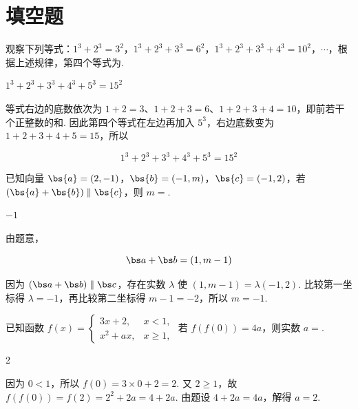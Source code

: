 \section{填空题}

\begin{problem}
观察下列等式：\(1^{3} + 2^{3} = 3^{2}\)，\(1^{3} + 2^{3} + 3^{3} = 6^{2}\)，\(1^{3} + 2^{3} + 3^{3} + 4^{3} = 10^{2}\)，\(\cdots\)，根据上述规律，第四个等式为\fillinblank{}.
\end{problem}

\begin{answer}
\(1^{3} + 2^{3} + 3^{3} + 4^{3} + 5^{3} = 15^{2}\)
\end{answer}

\begin{solution}
等式右边的底数依次为 \(1+2=3\)、\(1+2+3=6\)、\(1+2+3+4=10\)，即前若干个正整数的和. 因此第四个等式在左边再加入 \(5^3\)，右边底数变为 \(1+2+3+4+5=15\)，所以

\[
1^3+2^3+3^3+4^3+5^3=15^2
\]
\end{solution}

\begin{problem}
已知向量 \(\bs{a} = (2, -1)\)，\(\bs{b} = (-1, m)\)，\(\bs{c} = (-1, 2)\)，若 \((\bs{a} + \bs{b}) \parallel \bs{c}\)，则 \(m=\)\fillinblank{}.
\end{problem}

\begin{answer}
\(-1\)
\end{answer}

\begin{solution}
由题意，

\[
\bs a+\bs b=(1,m-1)
\]

因为 \((\bs a+\bs b)\parallel\bs c\)，存在实数 \(\lambda\) 使 \((1,m-1)=\lambda(-1,2)\). 比较第一坐标得 \(\lambda=-1\)，再比较第二坐标得 \(m-1=-2\)，所以 \(m=-1\).
\end{solution}

\begin{problem}
已知函数 \( f(x) = \begin{cases}
3x + 2, & x < 1,\\
x^2 + ax, & x \geqslant 1,
\end{cases} \) 若 \( f(f(0)) = 4a \)，则实数 \( a = \)\fillinblank{}.
\end{problem}

\begin{answer}
2
\end{answer}

\begin{solution}
因为 \(0<1\)，所以 \(f(0)=3\times0+2=2\). 又 \(2\geqslant1\)，故 \(f(f(0))=f(2)=2^2+2a=4+2a\). 由题设 \(4+2a=4a\)，解得 \(a=2\).
\end{solution}

